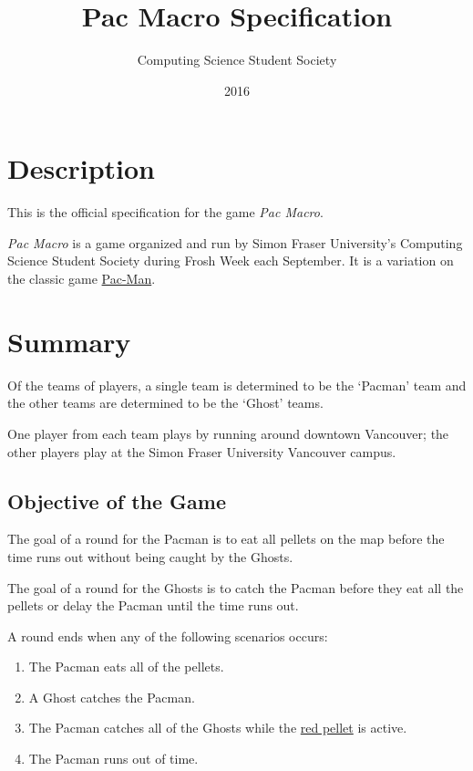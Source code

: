 \documentclass[10pt, oneside, letterpaper, titlepage]{article}
\title{Pac Macro Specification}
\author{Computing Science Student Society}
\date{2016}
\begin{document}
	\maketitle
	\clearpage
	\tableofcontents
	\clearpage

	\section{Description}
	\label{sec:description}

	This is the official specification for the game \emph{Pac Macro}.

	\emph{Pac Macro} is a game organized and run by Simon Fraser University's Computing Science Student Society during Frosh Week each September. It is a variation on the classic game \href{https://en.wikipedia.org/wiki/Pac-Man}{Pac-Man}.

	\section{Summary}
	\label{sec:summary}

	Of the teams of players, a single team is determined to be the `Pacman' team and the other teams are determined to be the `Ghost' teams.

	One player from each team plays by running around downtown Vancouver; the other players play at the Simon Fraser University Vancouver campus.

	\subsection{Objective of the Game}
	\label{subsec:summary:objective-of-the-game}

	The goal of a round for the Pacman is to eat all pellets on the map before the time runs out without being caught by the Ghosts.

	The goal of a round for the Ghosts is to catch the Pacman before they eat all the pellets or delay the Pacman until the time runs out.

	A round ends when any of the following scenarios occurs:
	\begin{enumerate}
		\item The Pacman eats all of the pellets.
		\item A Ghost catches the Pacman.
		\item The Pacman catches all of the Ghosts while the \hyperref[subsec:gameplay:formal-rules]{red pellet} is active.
		\item The Pacman runs out of time.
	\end{enumerate}
\end{document}
